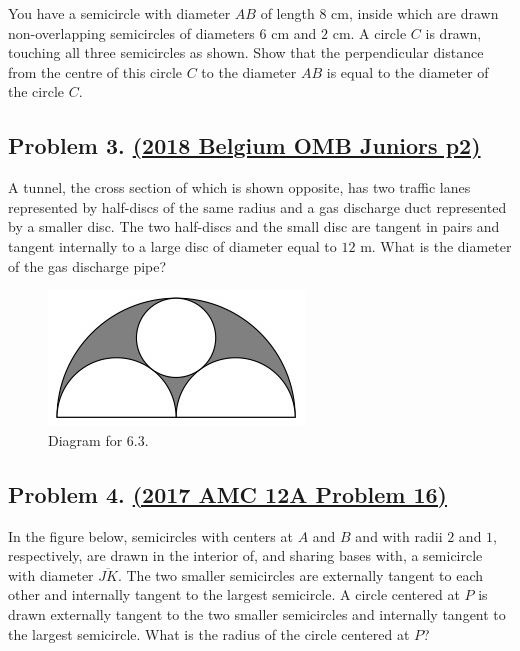 \documentclass{article}
\begin{document}
You have a semicircle with diameter $AB$ of length $8$ cm, inside which are drawn non-overlapping semicircles of diameters $6$ cm and $2$ cm. A circle $C$ is drawn, touching all three semicircles as shown. Show that the perpendicular distance from the centre of this circle $C$ to the diameter $AB$ is equal to the diameter of the circle $C$.

\subsection{Problem 3. \href{https://artofproblemsolving.com/community/c4h2384801}{(2018 Belgium OMB Juniors p2)}}

A tunnel, the cross section of which is shown opposite, has two traffic lanes represented by half-discs of the same radius and a gas discharge duct represented by a smaller disc. The two half-discs and the small disc are tangent in pairs and tangent internally to a large disc of diameter equal to $12$ m. What is the diameter of the gas discharge pipe?

\begin{figure}[ht]
\centering
\includegraphics[width=.5\textwidth]{6.3.png}
\caption{Diagram for 6.3.}
\end{figure}



\subsection{Problem 4. \href{https://artofproblemsolving.com/community/c5h1379993}{(2017 AMC 12A Problem 16)}}

In the figure below, semicircles with centers at $A$ and $B$ and with radii $2$ and $1$, respectively, are drawn in the interior of, and sharing bases with, a semicircle with diameter $\overline{JK}$. The two smaller semicircles are externally tangent to each other and internally tangent to the largest semicircle. A circle centered at $P$ is drawn externally tangent to the two smaller semicircles and internally tangent to the largest semicircle. What is the radius of the circle centered at $P$?
\end{document}
